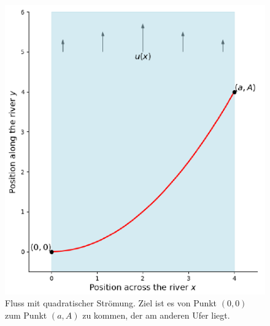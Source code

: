 %
%
%
\begin{figure}
    \centering
    \includegraphics{papers/schwimmen/tikz/quadratisch.pdf}
    \caption{Fluss mit quadratischer Strömung. Ziel ist es von Punkt \((0,0)\)
    zum Punkt \((a,A)\) zu kommen, der am anderen Ufer liegt.}
    \label{fig:river_template}
\end{figure}
